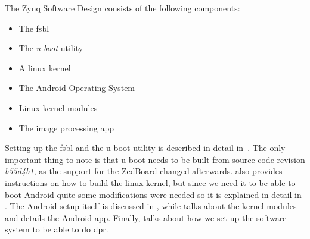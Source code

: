The Zynq Software Design consists of the following components:
\begin{itemize}
	\item The \gls{fsbl}
	\item The \emph{u-boot} utility
	\item A linux kernel
	\item The Android Operating System
	\item Linux kernel modules
	\item The image processing app
\end{itemize}
Setting up the \gls{fsbl} and the u-boot utility is described in detail
in~\cite{DigilentTutorial}.
The only important thing to note is that u-boot needs to be built from source
code revision \emph{b55d4b1}, as the support for the ZedBoard changed
afterwards.
\cite{DigilentTutorial} also provides instructions on how to build the linux
kernel, but since we need it to be able to boot Android quite some modifications
were needed so it is explained in detail in .
The Android setup itself is discussed in , while
 talks about the kernel modules and
 details the Android app.
Finally,  talks about how we set up
the software system to be able to do \gls{dpr}.
